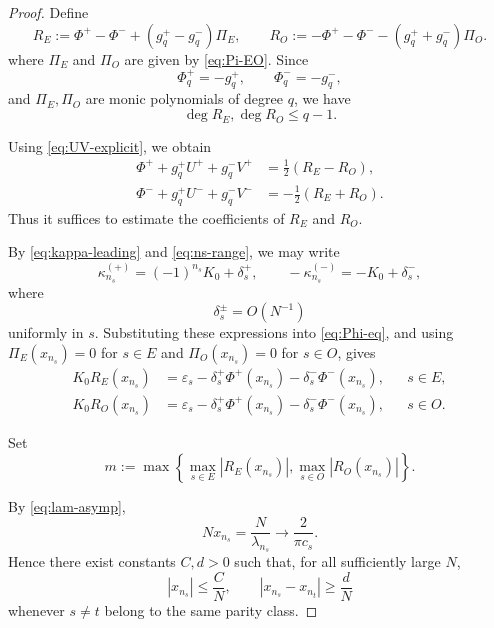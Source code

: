 \documentclass[11pt,a4paper]{article}
\theoremstyle{definition}
\begin{document}
\begin{proof}
Define
\begin{equation}\label{eq:RE-RO-def}
R_E
:=
\Phi^+-\Phi^-+(g_q^+-g_q^-)\Pi_E,
\qquad
R_O
:=
-\Phi^+-\Phi^--(g_q^++g_q^-)\Pi_O.
\end{equation}
where $\Pi_E$ and $\Pi_O$ are given by \eqref{eq:Pi-EO}. Since
\[
\Phi_q^+=-g_q^+,
\qquad
\Phi_q^-=-g_q^-,
\]
and $\Pi_E,\Pi_O$ are monic polynomials of degree $q$, we have
\[
\deg R_E,\deg R_O\leq q-1.
\]

Using \eqref{eq:UV-explicit}, we obtain
\begin{equation}\label{eq:R-comb}
\begin{aligned}
\Phi^++g_q^+U^++g_q^-V^+
&=
\frac{1}{2}(R_E-R_O),
\\
\Phi^-+g_q^+U^-+g_q^-V^-
&=
-\frac{1}{2}(R_E+R_O).
\end{aligned}
\end{equation}
Thus it suffices to estimate the coefficients of $R_E$ and $R_O$.

By \eqref{eq:kappa-leading} and \eqref{eq:ns-range}, we may write
\[
\kappa_{n_s}^{(+)}
=
(-1)^{n_s}K_0+\delta_s^+,
\qquad
-\kappa_{n_s}^{(-)}
=
-K_0+\delta_s^-,
\]
where
\[
\delta_s^\pm=O(N^{-1})
\]
uniformly in $s$. Substituting these expressions into
\eqref{eq:Phi-eq}, and using
$\Pi_E(x_{n_s})=0$ for $s\in E$ and
$\Pi_O(x_{n_s})=0$ for $s\in O$, gives
\begin{equation}\label{eq:R-values}
\begin{aligned}
K_0R_E(x_{n_s})
&=
\varepsilon_s
-\delta_s^+\Phi^+(x_{n_s})
-\delta_s^-\Phi^-(x_{n_s}),
&& s\in E,
\\
K_0R_O(x_{n_s})
&=
\varepsilon_s
-\delta_s^+\Phi^+(x_{n_s})
-\delta_s^-\Phi^-(x_{n_s}),
&& s\in O.
\end{aligned}
\end{equation}

Set
\begin{equation}\label{eq:m-def}
m:=
\max\left\{
\max_{s\in E}|R_E(x_{n_s})|,
\max_{s\in O}|R_O(x_{n_s})|
\right\}.
\end{equation}

By \eqref{eq:lam-asymp},
\[
Nx_{n_s}
=
\frac{N}{\lambda_{n_s}}
\longrightarrow
\frac{2}{\pi c_s}.
\]
Hence there exist constants $C,d>0$ such that, for all sufficiently
large $N$,
\begin{equation}\label{eq:node-bounds}
|x_{n_s}|\leq\frac{C}{N},
\qquad
|x_{n_s}-x_{n_t}|\geq\frac{d}{N}
\end{equation}
whenever $s\neq t$ belong to the same parity class.


\end{proof}
\end{document}
